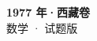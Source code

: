 \documentclass[zihao=-4, a4paper]{ctexart}
\begin{document}
\begin{center}
  {\Large\bfseries 1977 年·西藏卷}\\[4pt]
  {\large 数学 · 试题版}
\end{center}
\medskip
{}

\end{document}
